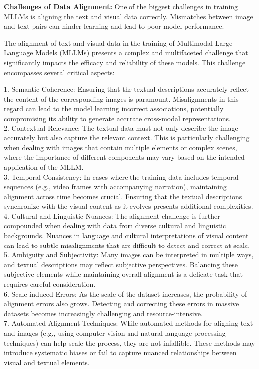 \textbf{Challenges of Data Alignment:} One of the biggest challenges in training MLLMs is aligning the text and visual data correctly. Mismatches between image and text pairs can hinder learning and lead to poor model performance.

The alignment of text and visual data in the training of Multimodal Large Language Models (MLLMs) presents a complex and multifaceted challenge that significantly impacts the efficacy and reliability of these models. This challenge encompasses several critical aspects:

1. Semantic Coherence: Ensuring that the textual descriptions accurately reflect the content of the corresponding images is paramount. Misalignments in this regard can lead to the model learning incorrect associations, potentially compromising its ability to generate accurate cross-modal representations.
\\
2. Contextual Relevance: The textual data must not only describe the image accurately but also capture the relevant context. This is particularly challenging when dealing with images that contain multiple elements or complex scenes, where the importance of different components may vary based on the intended application of the MLLM.
\\
3. Temporal Consistency: In cases where the training data includes temporal sequences (e.g., video frames with accompanying narration), maintaining alignment across time becomes crucial. Ensuring that the textual descriptions synchronize with the visual content as it evolves presents additional complexities.
\\
4. Cultural and Linguistic Nuances: The alignment challenge is further compounded when dealing with data from diverse cultural and linguistic backgrounds. Nuances in language and cultural interpretations of visual content can lead to subtle misalignments that are difficult to detect and correct at scale.
\\
5. Ambiguity and Subjectivity: Many images can be interpreted in multiple ways, and textual descriptions may reflect subjective perspectives. Balancing these subjective elements while maintaining overall alignment is a delicate task that requires careful consideration.
\\
6. Scale-induced Errors: As the scale of the dataset increases, the probability of alignment errors also grows. Detecting and correcting these errors in massive datasets becomes increasingly challenging and resource-intensive.
\\
7. Automated Alignment Techniques: While automated methods for aligning text and images (e.g., using computer vision and natural language processing techniques) can help scale the process, they are not infallible. These methods may introduce systematic biases or fail to capture nuanced relationships between visual and textual elements.
